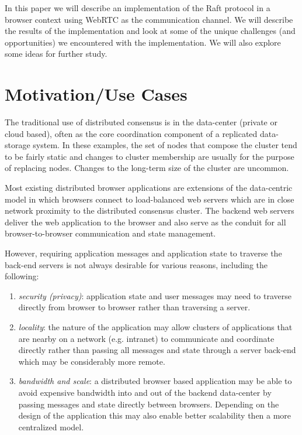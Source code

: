 \documentclass[9pt]{extarticle}
\begin{document}
\begin{multicols}{2}
In this paper we will describe an implementation of the Raft protocol
in a browser context using WebRTC as the communication channel. We
will describe the results of the implementation and look at some of
the unique challenges (and opportunities) we encountered with the
implementation. We will also explore some ideas for further study.

\section{Motivation/Use Cases}
The traditional use of distributed consensus is in the data-center
(private or cloud based), often as the core coordination component
of a replicated data-storage system. %
In these examples, the set of nodes that compose the cluster tend to
be fairly static and changes to cluster membership are usually for the
purpose of replacing nodes. Changes to the long-term size of the
cluster are uncommon. %

Most existing distributed browser applications are extensions of the
data-centric model in which browsers connect to load-balanced web
servers which are in close network proximity to the distributed
consensus cluster. %
The backend web servers deliver the web application to the browser and
also serve as the conduit for all browser-to-browser communication and
state management.

However, requiring application messages and application state to
traverse the back-end servers is not always desirable for various
reasons, including the following:

\begin{enumerate}
\item \emph{security (privacy)}: application state and user messages
    may need to traverse directly from browser to browser rather than
    traversing a server.
\item \emph{locality}: the nature of the application may allow
    clusters of applications that are nearby on a network (e.g.
    intranet) to communicate and coordinate directly rather than
    passing all messages and state through a server back-end which may
    be considerably more remote.
\item \emph{bandwidth and scale}: a distributed browser based
    application may be able to avoid expensive bandwidth into and out
    of the backend data-center by passing messages and state directly
    between browsers.  Depending on the design of the application this
    may also enable better scalability then a more centralized model.
\end{enumerate}


\end{multicols}
\end{document}
